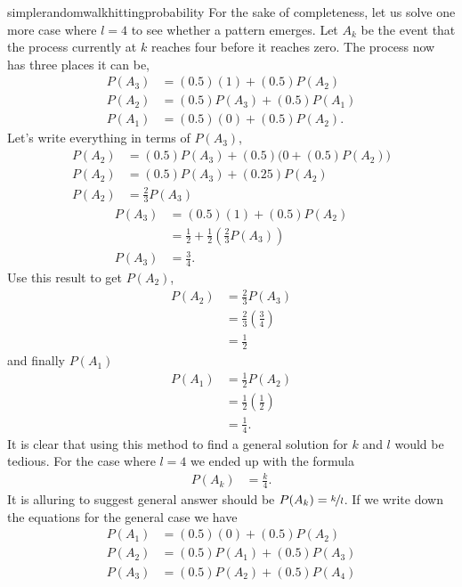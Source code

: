 \begin{answer}{simplerandomwalkhittingprobability}
For the sake of completeness, let us solve one more case where $l=4$ to see whether a pattern emerges.
Let $A_k$ be the event that the process currently at $k$ reaches four before it reaches zero.
The process now has three places it can be,
\begin{align*}
P(A_3) &= (0.5)(1) + (0.5)P(A_2)  \\
P(A_2) &= (0.5)P(A_3) + (0.5)P(A_1) \\
P(A_1) &= (0.5)(0) + (0.5)P(A_2)
\text{.}
\end{align*}
Let's write everything in terms of $P(A_3)$,
\begin{align*}
P(A_2) &= (0.5)P(A_3) + (0.5)\Big(0 + (0.5) P(A_2) \Big)  \\
P(A_2) &= (0.5) P(A_3)  + (0.25) P(A_2)  \\
P(A_2) &= \frac{2}{3} P(A_3)
\end{align*}
\begin{align*}
P(A_3) &= (0.5)(1) + (0.5) P(A_2)   \\
       &= \frac{1}{2} + \frac{1}{2}\left(\frac{2}{3}P(A_3)\right)  \\
            P(A_3) &= \frac{3}{4}
\text{.}
\end{align*}
Use this result to get $P(A_2)$,
\begin{align*}
P(A_2) &= \frac{2}{3} P(A_3)  \\
       &= \frac{2}{3}\left(\frac{3}{4}\right) \\
       &= \frac{1}{2}
\end{align*}
and finally $P(A_1)$
\begin{align*}
P(A_1) &= \frac{1}{2} P(A_2)        \\
       &= \frac{1}{2}\left( \frac{1}{2} \right) \\
       &= \frac{1}{4}
\text{.}
\end{align*}
It is clear that using this method to find a general solution for $k$ and $l$ would be tedious.
For the case where $l=4$ we ended up with the formula
\begin{align*}
P(A_k) &= \frac{k}{4}
\text{.}
\end{align*}
It is alluring to suggest general answer should be
$P(A_k) = \nicefrac{k}{l}$.
If we write down the equations for the general case we have
\begin{align*}
P(A_1) &= (0.5)(0)      + (0.5) P(A_2)  \\
P(A_2) &= (0.5) P(A_1)  + (0.5) P(A_3)  \\
P(A_3) &= (0.5) P(A_2)  + (0.5) P(A_4)  \\

\end{align*}
\end{answer}
